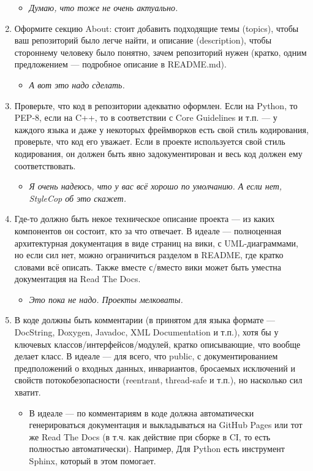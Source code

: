 \documentclass{../../text-style}
\begin{document}
\begin{enumerate}
    \begin{itemize}
        \item \emph{Думаю, что тоже не очень актуально.}
    \end{itemize}
    \item Оформите секцию About: стоит добавить подходящие темы (topics), чтобы ваш репозиторий было легче найти, и описание (description), чтобы стороннему человеку было понятно, зачем репозиторий нужен (кратко, одним предложением --- подробное описание в README.md).
    \begin{itemize}
        \item \emph{А вот это надо сделать.}
    \end{itemize}
    \item Проверьте, что код в репозитории адекватно оформлен. Если на Python, то PEP-8, если на C++, то в соответствии с Core Guidelines и т.п. --- у каждого языка и даже у некоторых фреймворков есть свой стиль кодирования, проверьте, что код его уважает. Если в проекте используется свой стиль кодирования, он должен быть явно задокументирован и весь код должен ему соответствовать.
    \begin{itemize}
        \item \emph{Я очень надеюсь, что у вас всё хорошо по умолчанию. А если нет, StyleCop об это скажет.}
    \end{itemize}
    \item Где-то должно быть некое техническое описание проекта --- из каких компонентов он состоит, кто за что отвечает. В идеале --- полноценная архитектурная документация в виде страниц на вики, с UML-диаграммами, но если сил нет, можно ограничиться разделом в README, где кратко словами всё описать. Также вместе с/вместо вики может быть уместна документация на Read The Docs.
    \begin{itemize}
        \item \emph{Это пока не надо. Проекты мелковаты.}
    \end{itemize}
    \item В коде должны быть комментарии (в принятом для языка формате --- DocString, Doxygen, Javadoc, XML Documentation и т.п.), хотя бы у ключевых классов/интерфейсов/модулей, кратко описывающие, что вообще делает класс. В идеале --- для всего, что public, с документированием предположений о входных данных, инвариантов, бросаемых исключений и свойств потокобезопасности (reentrant, thread-safe и т.п.), но насколько сил хватит.
    \begin{itemize}
        \item В идеале --- по комментариям в коде должна автоматически генерироваться документация и выкладываться на GitHub Pages или тот же Read The Docs (в т.ч. как действие при сборке в CI, то есть полностью автоматически). Например, Для Python есть инструмент Sphinx, который в этом помогает.

\end{itemize}
\end{enumerate}
\end{document}
